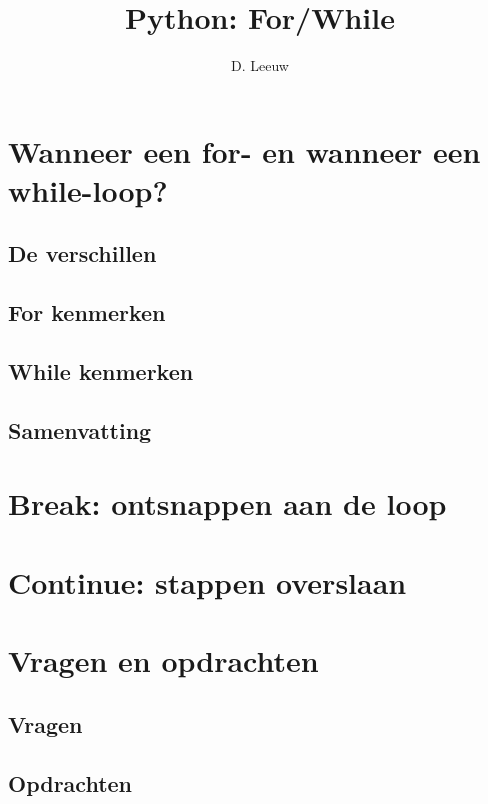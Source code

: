 \documentclass[a4paper,12pt,twoside,openright,titlepage]{article}
\author{D. Leeuw}
\title{Python: For/While}
\date{\today\\
1.0.0\\
\vfill
\raggedright
\copyright\ 2025 Dennis Leeuw\\
}
\begin{document}

\maketitle



\section{Wanneer een for- en wanneer een while-loop?}

\subsection{De verschillen}

\subsection{For kenmerken}

\subsection{While kenmerken}

\subsection{Samenvatting}


\section{Break: ontsnappen aan de loop}


\section{Continue: stappen overslaan}


\section{Vragen en opdrachten}
\subsection{Vragen}

\subsection{Opdrachten}


\printindex
\end{document}

